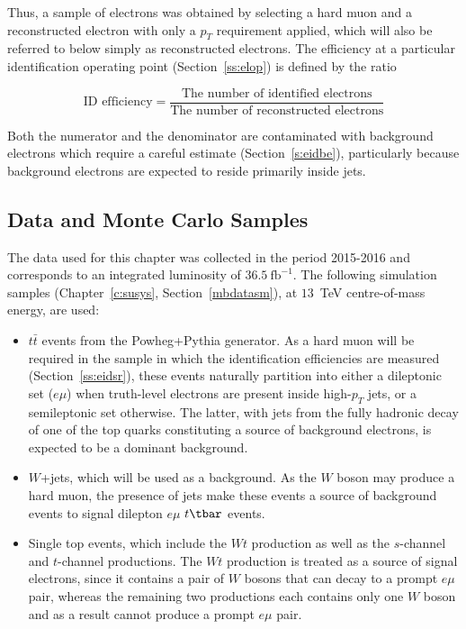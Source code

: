 Thus, a sample of electrons was obtained by selecting a hard muon and a
reconstructed electron with only a $p_T$ requirement applied, which will also
be referred to below simply as reconstructed electrons. The efficiency at a
particular identification operating point (Section~\ref{ss:elop}) is defined by
the ratio

$$
	\text{ID efficiency} = \frac{\text{The number of identified
			electrons}}{\text{The number of reconstructed electrons}}
$$

Both the numerator and the denominator are contaminated with background
electrons which require a careful estimate (Section~\ref{s:eidbe}),
particularly because background electrons are expected to reside primarily
inside jets.

\subsection{Data and Monte Carlo Samples}\label{ss:eidsp}

The data used for this chapter was collected in the period 2015-2016 and
corresponds to an integrated luminosity of $36.5~\text{fb}^{-1}$. The following
simulation samples (Chapter~\ref{c:susys}, Section~\ref{mbdatasm}),
at $13$~TeV centre-of-mass energy, are used:


\begin{itemize}

	\item $t\bar{t}$ events from the Powheg+Pythia generator. As a hard muon will
	      be required in the sample in which the identification efficiencies are measured
	      (Section~\ref{ss:eidsr}), these events naturally partition into either a
	      dileptonic set ($e\mu$) when truth-level electrons are present inside
	      high-$p_T$ jets, or a semileptonic set otherwise. The latter, with jets from
	      the fully hadronic decay of one of the top quarks constituting a source of
	      background electrons, is expected to be a dominant background.

	\item $W$+jets, which will be used as a background. As the $W$ boson may
	      produce a hard muon, the presence of jets make these events a source of
	      background events to signal dilepton $e\mu$ $t\tbar$ events.

	\item Single top events, which include the $Wt$ production as well as the
	      $s$-channel and $t$-channel productions. The $Wt$ production is treated as a
	      source of signal electrons, since it contains a pair of $W$ bosons that can
	      decay to a prompt $e\mu$ pair, whereas the remaining two productions each
	      contains only one $W$ boson and as a result cannot produce a prompt $e\mu$
	      pair.

\end{itemize}

